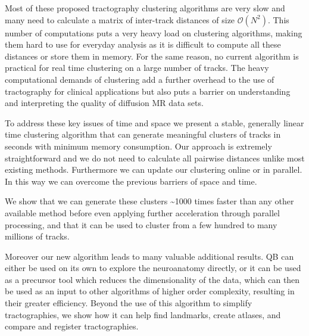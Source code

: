 \documentclass{bioinfo}
\begin{document}
Most of these proposed tractography clustering algorithms are very slow and many
need to calculate a matrix of inter-track distances of size $\mathcal{O}(N^2)$.
This number of computations puts a very heavy load on clustering algorithms,
making them hard to use for everyday analysis as it is difficult to compute all
these distances or store them in memory. For the same reason, no current
algorithm is practical for real time clustering on a large number of tracks. The
heavy computational demands of clustering add a further overhead to the use of
tractography for clinical applications but also puts a barrier on understanding
and interpreting the quality of diffusion MR data sets.

To address these key issues of time and space we present a stable,
generally linear time clustering algorithm that can generate meaningful
clusters of tracks in seconds with minimum memory consumption. Our
approach is extremely straightforward and we do not need to calculate
all pairwise distances unlike most existing
methods. Furthermore we can update our clustering online or in
parallel. In this way we can overcome the previous barriers of space and
time.

We show that we can generate these clusters \textasciitilde1000 times faster than
any other available method before even applying further
acceleration through parallel processing, and that it can be used to
cluster from a few hundred to many millions of tracks.

Moreover our new algorithm leads to many valuable additional results. QB
can either be used on its own to explore the neuroanatomy directly, or
it can be used as a precursor tool which reduces the dimensionality of
the data, which can then be used as an input to other algorithms of
higher order complexity, resulting in their greater efficiency. Beyond
the use of this algorithm to simplify tractographies, we show how it can
help find landmarks, create atlases, and compare and register
tractographies.
\end{document}
